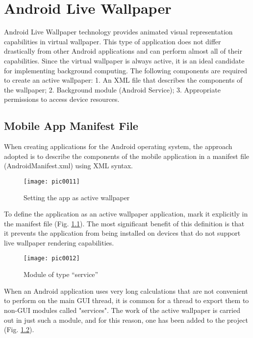 \newpage
\chapter{Android Live Wallpaper}
\label{chapter04}

Android Live Wallpaper technology provides animated visual representation capabilities in virtual wallpaper. This type of application does not differ drastically from other Android applications and can perform almost all of their capabilities. Since the virtual wallpaper is always active, it is an ideal candidate for implementing background computing. The following components are required to create an active wallpaper: 1. An XML file that describes the components of the wallpaper; 2. Background module (Android Service); 3. Appropriate permissions to access device resources.

\section{Mobile App Manifest File}

When creating applications for the Android operating system, the approach adopted is to describe the components of the mobile application in a manifest file (AndroidManifest.xml) using XML syntax.

\begin{figure}[h]
\centering
\texttt{[image: pic0011]}
\caption{Setting the app as active wallpaper}
\label{fig:pic0011}
\end{figure}
\FloatBarrier

To define the application as an active wallpaper application, mark it explicitly in the manifest file (Fig. \ref{fig:pic0011}). The most significant benefit of this definition is that it prevents the application from being installed on devices that do not support live wallpaper rendering capabilities.

\begin{figure}[h]
\centering
\texttt{[image: pic0012]}
\caption{Module of type ``service''}
\label{fig:pic0012}
\end{figure}
\FloatBarrier

When an Android application uses very long calculations that are not convenient to perform on the main GUI thread, it is common for a thread to export them to non-GUI modules called "services". The work of the active wallpaper is carried out in just such a module, and for this reason, one has been added to the project (Fig. \ref{fig:pic0012}).

